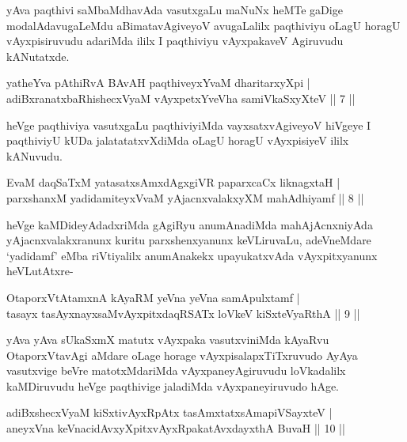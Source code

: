 \begin{artha}
yAva paqthivi saMbaMdhavAda vasutxgaLu maNuNx heMTe gaDige modalAdavugaLeMdu aBimatavAgiveyoV avugaLalilx paqthiviyu oLagU horagU vAyxpisiruvudu adariMda ililx I paqthiviyu vAyxpakaveV Agiruvudu kANutatxde. 
\end{artha}

\begin{shl}
yatheYva pAthiRvA BAvAH paqthiveyxYvaM dharitarxyXpi |\\
adiBxranatxbaRhishecxVyaM vAyxpetxYveVha samiVkaSxyXteV \hfill || 7 ||
\end{shl}

\begin{artha}
heVge paqthiviya vasutxgaLu paqthiviyiMda vayxsatxvAgiveyoV hiVgeye I paqthiviyU kUDa jalatatatxvXdiMda oLagU horagU vAyxpisiyeV ililx kANuvudu.
\end{artha}

\begin{shl}
EvaM daqSaTxM yatasatxsAmxdAgxgiVR paparxcaCx liknagxtaH |\\
parxshanxM yadidamiteyxVvaM yAjacnxvalakxyXM mahAdhiyamf \hfill || 8 ||
\end{shl}

\begin{artha}
heVge kaMDideyAdadxriMda gAgiRyu anumAnadiMda mahAjAcnxniyAda yAjacnxvalakxranunx kuritu parxshenxyanunx  keVLiruvaLu, adeVneMdare `yadidamf' eMba riVtiyalilx anumAnakekx upayukatxvAda vAyxpitxyanunx heVLutAtxre-
\end{artha}


\begin{shl}
OtaporxVtAtamxnA kAyaRM yeVna yeVna samApulxtamf |\\
tasayx tasAyxnayxsaMvAyxpitxdaqRSATx loVkeV kiSxteVyaRthA \hfill || 9 ||
\end{shl}

\begin{artha}
yAva yAva sUkaSxmX matutx vAyxpaka vasutxviniMda kAyaRvu OtaporxVtavAgi aMdare oLage horage vAyxpisalapxTiTxruvudo AyAya vasutxvige beVre matotxMdariMda vAyxpaneyAgiruvudu loVkadalilx kaMDiruvudu heVge paqthivige jaladiMda vAyxpaneyiruvudo hAge. 
\end{artha}

\begin{shl}
adiBxshecxVyaM kiSxtivAyxRpAtx tasAmxtatxsAmapiVSayxteV |\\
aneyxVna keVnacidAvxyXpitxvAyxRpakatAvxdayxthA BuvaH \hfill || 10 ||
\end{shl}

